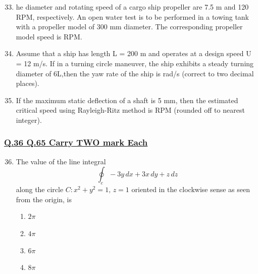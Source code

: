 \documentclass[journal]{IEEEtran}
\theoremstyle{remark}
\begin{document}
\begin{enumerate}[itemsep=1em]
\setcounter{enumi}{32}
\item he diameter and rotating speed of a cargo ship propeller are 7.5 m and 120 RPM, respectively.  An open water test is to be performed in a towing tank with a propeller model of 300 mm diameter. The corresponding propeller model speed is \underline{\hspace{2cm}} RPM. 
\end{enumerate}

\begin{enumerate}[itemsep=1em]
\setcounter{enumi}{33}
\item Assume that a ship has length L = 200 m and operates at a design speed U = 12 m/s. 
If in a turning circle maneuver, the ship exhibits a steady turning diameter of 6L,then the yaw rate of the ship is \underline{\hspace{2cm}} rad/s (correct to two decimal places). 
\end{enumerate}

\begin{enumerate}[itemsep=1em]
\setcounter{enumi}{34}
\item If the maximum static deflection of a shaft is 5 mm, then the estimated critical speed using Rayleigh-Ritz method is \underline{\hspace{2cm}} RPM (rounded off to nearest integer). 
\end{enumerate}

\newpage
\vspace*{0.25cm}

\subsubsection{\underline{Q.36 \text{-} Q.65 Carry TWO mark Each}}

\begin{enumerate}[itemsep=1em]
\setcounter{enumi}{35}
\item The value of the line integral 
\[
\oint_c -3y\,dx+3x\,dy+z\,dz
\]
along the circle $C:x^2+y^2=1,\, z=1$ oriented in the clockwise sense as seen from the origin, is
\begin{multicols}{4}
\begin{enumerate}
    \item $2\pi$
    \item $4\pi$
    \item $6\pi$
    \item $8\pi$
\end{enumerate}
\end{multicols}
\end{enumerate}
\end{document}
